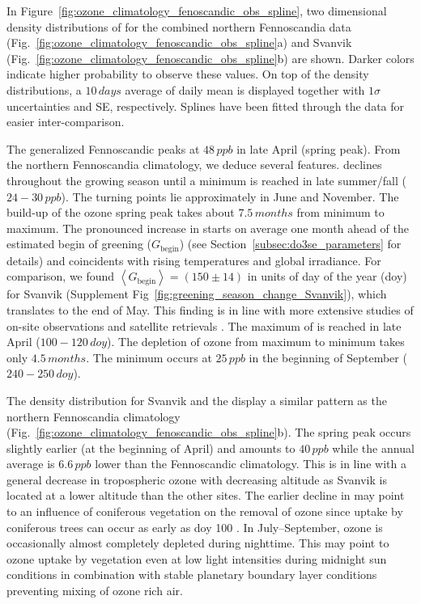 \documentclass[bg, manuscript]{copernicus}
\begin{document}
In Figure~\ref{fig:ozone_climatology_fenoscandic_obs_spline}, two dimensional density distributions of \chem{[O_3]} for the combined northern Fennoscandia data (Fig.~\ref{fig:ozone_climatology_fenoscandic_obs_spline}a) and Svanvik (Fig.~\ref{fig:ozone_climatology_fenoscandic_obs_spline}b) are shown. Darker colors indicate higher probability to observe these values. On top of the density distributions, a $10\,\unit{days}$ average of daily mean  is displayed together with $1 \sigma$ uncertainties and SE, respectively. Splines have been fitted through the data for easier inter-comparison.

The generalized Fennoscandic \chem{\left<[O_3]\right>} peaks at $48\,\unit{ppb}$ in late April (spring peak). From the northern Fennoscandia climatology, we deduce several features. \chem{\left<[O_3]\right>} declines throughout the growing season until a minimum is reached in late summer/fall ($24-30\,\unit{ppb}$). The turning points lie approximately in June and November. The build-up of the ozone spring peak takes about $7.5\,\unit{months}$ from minimum to maximum. The pronounced increase in \chem{\left<[O_3]\right>} starts on average one month ahead of the estimated begin of greening ($G_\mathrm{begin}$) (see Section~\ref{subsec:do3se_parameters} for details) and coincidents with rising temperatures and global irradiance. For comparison, we found $\left<G_\mathrm{begin}\right> = (150 \pm 14)$ in units of day of the year (\unit{doy}) for Svanvik (Supplement Fig~\ref{fig:greening_season_change_Svanvik}), which translates to the end of May. This finding is in line with more extensive studies of on-site observations and satellite retrievals \citep[][e.g.,]{IJB:Karlsen2007,AFM:Linderholm2006}. The maximum of  is reached in late April ($100-120\,\unit{doy}$). The depletion of ozone from maximum to minimum takes only $4.5\,\unit{months}$. The minimum occurs at $25\,\unit{ppb}$ in the beginning of September ($240-250\,\unit{doy}$).

The density distribution for Svanvik and the  display a similar pattern as the northern Fennoscandia climatology (Fig.~\ref{fig:ozone_climatology_fenoscandic_obs_spline}b). The spring peak occurs slightly earlier (at the beginning of April) and amounts to $40\,\unit{ppb}$ while the annual average \chem{\left<[O_3]\right>} is $6.6\,\unit{ppb}$ lower than the Fennoscandic climatology. This is in line with a general decrease in tropospheric ozone with decreasing altitude as Svanvik is located at a lower altitude than the other sites. The earlier decline in \chem{\left<[O_3\right>]} may point to an influence of coniferous vegetation on the removal of ozone since uptake by coniferous trees can occur as early as \unit{doy} 100 \citep{TB:Kolari2007, TP:Wallin2013}. In July--September, ozone is occasionally almost completely depleted during nighttime. This may point to ozone uptake by vegetation even at low light intensities during midnight sun conditions in combination with stable planetary boundary layer conditions preventing mixing of ozone rich air.
\end{document}
